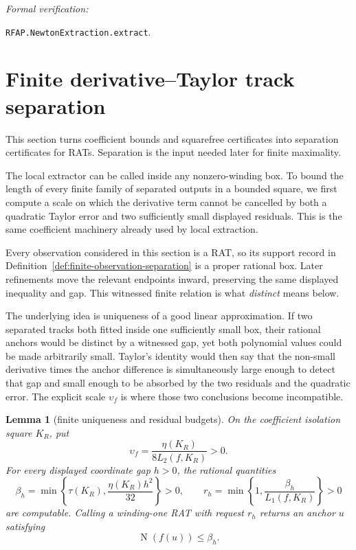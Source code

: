 \documentclass[11pt]{article}
\newtheorem{lemma}[theorem]{Lemma}
\newcommand{\Norm}[1]{\operatorname{N}\!\left(#1\right)}
\newcommand{\Defref}[1]{Definition~\ref{#1}}
\newcommand{\leanref}[1]{\par\smallskip\noindent
  \emph{Formal verification:}\par\nobreak
  {\raggedright\nolinkurl{#1}.\par}}
\begin{document}
\leanref{RFAP.NewtonExtraction.extract}

\section{Finite derivative--Taylor track separation}
\label{sec:track-separation}

This section turns coefficient bounds and squarefree certificates into
separation certificates for RATs.  Separation is the input needed later for
finite maximality.

The local extractor can be called inside any nonzero-winding box.  To
bound the length of every finite family of separated outputs in a bounded
square, we first compute a scale on which the derivative term cannot be
cancelled by both a quadratic Taylor error and two sufficiently small
displayed residuals.  This is the same coefficient machinery already used
by local extraction.

Every observation considered in this section is a RAT, so its support record
in \Defref{def:finite-observation-separation} is a proper rational box.
Later refinements move the relevant endpoints inward, preserving the same
displayed inequality and gap.  This witnessed finite relation is what
\emph{distinct} means below.

The underlying idea is uniqueness of a good linear approximation.  If two
separated tracks both fitted inside one sufficiently small box, their
rational anchors would be distinct by a witnessed gap, yet both polynomial
values could be made arbitrarily small.  Taylor's identity would then say
that the non-small derivative times the anchor difference is simultaneously
large enough to detect that gap and small enough to be absorbed by the two
residuals and the quadratic error.  The explicit scale $\upsilon_f$ is where
those two conclusions become incompatible.

\begin{lemma}[finite uniqueness and residual budgets]
\label{lem:separation-budgets}
On the coefficient isolation square $K_R$, put
\[
 \upsilon_f=
 \frac{\eta(K_R)}{8L_2(f,K_R)}>0.
\]
For every displayed coordinate gap $h>0$, the rational quantities
\[
 \beta_h=\min\left\{\tau(K_R),
        \frac{\eta(K_R)h^2}{32}\right\}>0,
 \qquad
 r_h=\min\left\{1,\frac{\beta_h}{L_1(f,K_R)}\right\}>0
\]
are computable.  Calling a winding-one RAT with request $r_h$ returns an
anchor $u$ satisfying
\[
                         \Norm{f(u)}\le\beta_h.
\]
\end{lemma}
\end{document}
